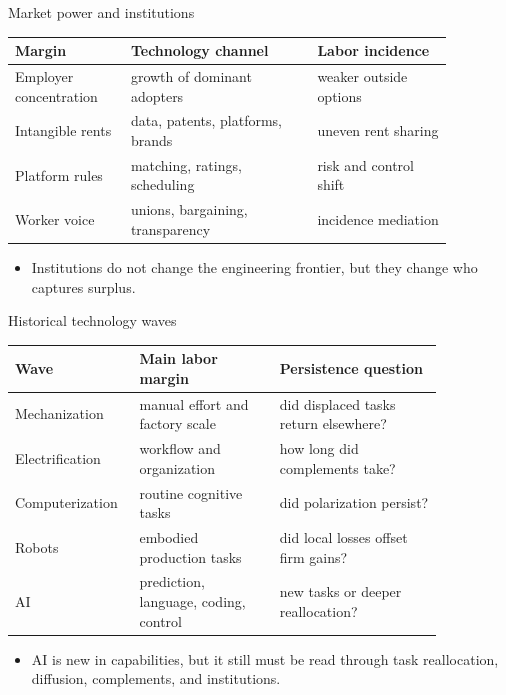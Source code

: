 \documentclass[aspectratio=169,11pt]{beamer}
\begin{document}
\begin{frame}{Market power and institutions}
\small
\begin{tabular}{p{0.23\linewidth} p{0.37\linewidth} p{0.27\linewidth}}
\toprule
Margin & Technology channel & Labor incidence \\
\midrule
Employer concentration & growth of dominant adopters & weaker outside options \\
Intangible rents & data, patents, platforms, brands & uneven rent sharing \\
Platform rules & matching, ratings, scheduling & risk and control shift \\
Worker voice & unions, bargaining, transparency & incidence mediation \\
\bottomrule
\end{tabular}
\vspace{0.35cm}
\begin{itemize}
    \item Institutions do not change the engineering frontier, but they change who captures surplus.
\end{itemize}
\end{frame}

\begin{frame}{Historical technology waves}
\small
\begin{tabular}{p{0.20\linewidth} p{0.30\linewidth} p{0.35\linewidth}}
\toprule
Wave & Main labor margin & Persistence question \\
\midrule
Mechanization & manual effort and factory scale & did displaced tasks return elsewhere? \\
Electrification & workflow and organization & how long did complements take? \\
Computerization & routine cognitive tasks & did polarization persist? \\
Robots & embodied production tasks & did local losses offset firm gains? \\
AI & prediction, language, coding, control & new tasks or deeper reallocation? \\
\bottomrule
\end{tabular}
\vspace{0.3cm}
\begin{itemize}
    \item AI is new in capabilities, but it still must be read through task reallocation, diffusion, complements, and institutions.
\end{itemize}
\end{frame}
\end{document}
